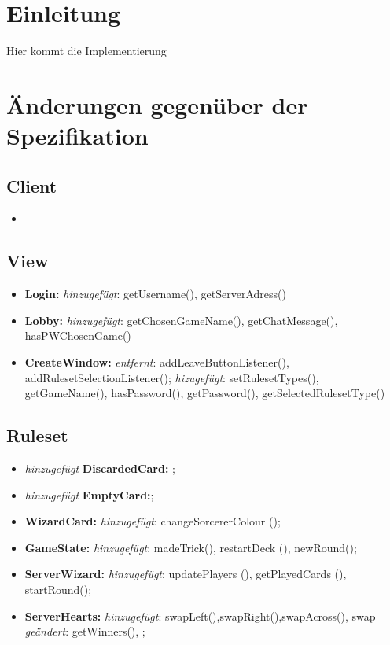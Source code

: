 \documentclass{article}
\begin{document}
\tableofcontents
\newpage

\section{Einleitung}
Hier kommt die Implementierung

\newpage

\section{Änderungen gegenüber der Spezifikation}

\subsection{Client}

\begin{itemize}
\item 
\end{itemize}

\subsection{View}

\begin{itemize}
\item \textbf{Login:} \textit{hinzugefügt}: getUsername(), getServerAdress()
\item \textbf{Lobby:} \textit{hinzugefügt}: getChosenGameName(), getChatMessage(), hasPWChosenGame()
\item \textbf{CreateWindow:} \textit{entfernt}: addLeaveButtonListener(), addRulesetSelectionListener(); \textit{hizugefügt}: setRulesetTypes(), getGameName(), hasPassword(), getPassword(), getSelectedRulesetType()
\end{itemize}

\subsection{Ruleset}

\begin{itemize}
\item \textit{hinzugefügt} \textbf{DiscardedCard:} ;

\item \textit{hinzugefügt} \textbf{EmptyCard:};

\item \textbf{WizardCard:} \textit{hinzugefügt}: changeSorcererColour ();

\item \textbf{GameState:} \textit{hinzugefügt}: madeTrick(), restartDeck (), newRound();

\item \textbf{ServerWizard:} \textit{hinzugefügt}: updatePlayers (), getPlayedCards (),
startRound(); 

\item \textbf{ServerHearts:} \textit{hinzugefügt}: swapLeft(),swapRight(),swapAcross(), swap
\textit{geändert}: getWinners(),  ;
\end{itemize}
\end{document}
